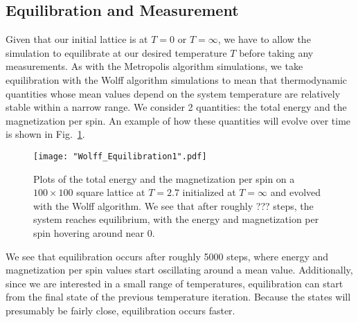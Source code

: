 \documentclass[twocolumn,aps,prl]{revtex4-1} %
\begin{document}
\subsection{Equilibration and Measurement}
Given that our initial lattice is at $T = 0$ or $T = \infty$, we have to allow the simulation to equilibrate at our desired temperature $T$ before taking any measurements. As with the Metropolis algorithm simulations, we take equilibration with the Wolff algorithm simulations to mean that thermodynamic quantities whose mean values depend on the system temperature are relatively stable within a narrow range. We consider 2 quantities: the total energy and the magnetization per spin. An example of how these quantities will evolve over time is shown in Fig.~\ref{fig:equil}. 
\begin{figure}
	\texttt{[image: "Wolff\_Equilibration1".pdf]}
	\caption{\label{fig:equil}Plots of the total energy and the magnetization per spin on a $100 \times 100$ square lattice at $T = 2.7$ initialized at $T = \infty$ and evolved with the Wolff algorithm. We see that after roughly ??? steps, the system reaches equilibrium, with the energy and magnetization per spin hovering around near $0$.}
\end{figure}

We see that equilibration occurs after roughly 5000 steps, where energy and magnetization per spin values start oscillating around a mean value. Additionally, since we are interested in a small range of temperatures, equilibration can start from the final state of the previous temperature iteration. Because the states will presumably be fairly close, equilibration occurs faster.
\end{document}
